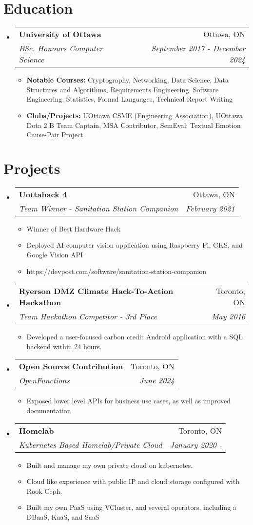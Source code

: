 \documentclass[letterpaper,11pt]{article}
\makeatletter
\newcommand{\resumeItem}[2]{
  \item\small{
    \textbf{#1}{#2 \vspace{-2pt}}
  }
}
\newcommand{\resumeSubheading}[4]{
  \vspace{-1pt}\item
    \begin{tabular*}{0.97\textwidth}[t]{l@{\extracolsep{\fill}}r}
      \textbf{#1} & #2 \\
      \textit{\small#3} & \textit{\small #4} \\
    \end{tabular*}\vspace{-5pt}
}
\newcommand{\resumeSubHeadingListStart}{\begin{itemize}[leftmargin=*]}
\newcommand{\resumeSubHeadingListEnd}{\end{itemize}}
\newcommand{\resumeItemListStart}{\begin{itemize}}
\newcommand{\resumeItemListEnd}{\end{itemize}\vspace{-5pt}}
\makeatother
\begin{document}
\section{Education}
\resumeSubHeadingListStart
  \resumeSubheading
    {University of Ottawa}{Ottawa, ON}
    {BSc. Honours Computer Science}{September 2017 - December 2024}
    \resumeItemListStart
      \resumeItem{Notable Courses: }{Cryptography, Networking, Data Science, Data Structures and Algorithms, Requirements Engineering, Software Engineering, Statistics, Formal Languages, Technical Report Writing}
      \resumeItem{Clubs/Projects: }{UOttawa CSME (Engineering Association), UOttawa Dota 2 B Team Captain, MSA Contributor, SemEval: Textual Emotion Cause-Pair Project}
    \resumeItemListEnd
\resumeSubHeadingListEnd

\section{Projects}
\resumeSubHeadingListStart
  \resumeSubheading
  {Uottahack 4}{Ottawa, ON}
  {Team Winner - Sanitation Station Companion}{February 2021}
    \resumeItemListStart
      \resumeItem{}
      {Winner of Best Hardware Hack}
      \resumeItem{}
      {Deployed AI computer vision application using Raspberry Pi, GKS, and Google Vision API}
      \resumeItem{}
      {https://devpost.com/software/sanitation-station-companion}
    \resumeItemListEnd
  \resumeSubheading
  {Ryerson DMZ Climate Hack-To-Action Hackathon}{Toronto, ON}
  {Team Hackathon Competitor - 3rd Place}{May 2016}
    \resumeItemListStart
      \resumeItem{}
      {Developed a user-focused carbon credit Android application with a SQL backend within 24 hours.}
    \resumeItemListEnd
  \resumeSubheading
  {Open Source Contribution}{Toronto, ON}
  {OpenFunctions}{June 2024}
    \resumeItemListStart
      \resumeItem{}
      {Exposed lower level APIs for business use cases, as well as improved documentation}
    \resumeItemListEnd
  \resumeSubheading
  {Homelab}{Toronto, ON}
  {Kubernetes Based Homelab/Private Cloud}{January 2020 -}
    \resumeItemListStart
      \resumeItem{}
      {Built and manage my own private cloud on kubernetes.}
      \resumeItem{}
      {Cloud like experience with public IP and cloud storage configured with Rook Ceph.}
      \resumeItem{}
      {Built my own PaaS using VCluster, and several operators, including a DBaaS, KaaS, and SaaS}
    \resumeItemListEnd
\resumeSubHeadingListEnd

\end{document}
